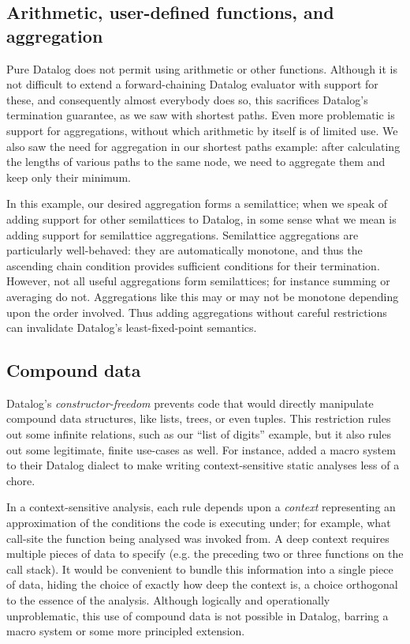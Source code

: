 
\subsection{Arithmetic, user-defined functions, and aggregation}

Pure Datalog does not permit using arithmetic or other functions.
%
Although it is not difficult to extend a forward-chaining Datalog evaluator with support for these, and consequently almost everybody does so, this sacrifices Datalog's termination guarantee, as we saw with shortest paths.
%
Even more problematic is support for aggregations, without which arithmetic by itself is of limited use.
%
We also saw the need for aggregation in our shortest paths example: after calculating the lengths of various paths to the same node, we need to aggregate them and keep only their minimum.

In this example, our desired aggregation forms a semilattice; when we speak of adding support for other semilattices to Datalog, in some sense what we mean is adding support for semilattice aggregations.
%
Semilattice aggregations are particularly well-behaved: they are automatically
monotone, and thus the ascending chain condition provides
sufficient conditions for their termination.
%
However, not all useful aggregations form semilattices; for instance summing or averaging do not.
%
Aggregations like this may or may not be monotone depending upon the order involved. Thus adding aggregations without careful restrictions can invalidate Datalog's least-fixed-point semantics.


\subsection{Compound data}

Datalog's \emph{constructor-freedom} prevents code that would directly
manipulate compound data structures, like lists, trees, or even tuples. This
restriction rules out some infinite relations, such as our ``list of digits''
example, but it also rules out some legitimate, finite use-cases as well.
%
For instance, \citet{DBLP:conf/datalog/SmaragdakisB10} added a macro system to
their Datalog dialect to make writing context-sensitive static analyses less of
a chore.

In a context-sensitive analysis, each rule depends upon a \emph{context} representing an approximation of the conditions the code is executing under; for example, what call-site the function being analysed was invoked from.
%
A deep context requires multiple pieces of data to specify (e.g. the preceding
two or three functions on the call stack).
%
It would be convenient to bundle this information into a single piece of data,
hiding the choice of exactly how deep the context is, a choice orthogonal to the
essence of the analysis.
%
Although logically and operationally unproblematic, this use of compound data is
not possible in Datalog, barring a macro system or some more principled
extension.

